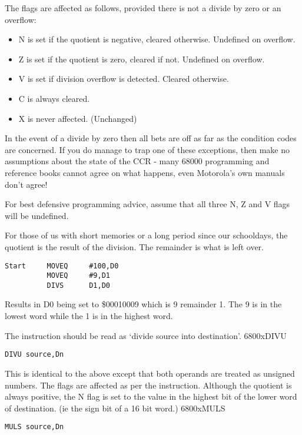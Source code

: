 The flags are affected as follows, provided there is not a divide by zero or an overflow:
\begin{itemize}[itemsep=0pt]

\item{}N is set if the quotient is negative, cleared otherwise.
          Undefined on overflow.


\item{}Z is set if the quotient is zero, cleared if not. Undefined on
          overflow.


\item{}V is set if division overflow is detected. Cleared
          otherwise.


\item{}C is always cleared.


\item{}X is never affected. (Unchanged)

\end{itemize}

\begin{warning}
In the event of a divide by zero then all bets are off as far as the condition codes are concerned. If you do manage to trap one of these exceptions, then make no assumptions about the state of the CCR - many 68000 programming and reference books cannot agree on what happens, even  Motorola's own manuals don't agree!

For best defensive programming advice, assume that all three N, Z and V flags will be undefined.
\end{warning}

For those of us with short memories or a long period since our
      schooldays, the quotient is the result of the division. The remainder is
      what is left over.

\begin{lstlisting}[firstnumber=1,caption={DIVS Example}]
Start     MOVEQ     #100,D0
          MOVEQ     #9,D1
          DIVS      D1,D0
\end{lstlisting}

Results in D0 being set to \$00010009 which is 9 remainder 1. The 9
      is in the lowest word while the 1 is in the highest word.

The instruction should be read as `divide source into
      destination'.
\mc6800x{DIVU}
\begin{lstlisting}[firstnumber=1]
          DIVU source,Dn
\end{lstlisting}

This is identical to the above except that both operands are
      treated as unsigned numbers. The flags are affected as per the 
      instruction. Although the quotient is always positive, the N flag is set
      to the value in the highest bit of the lower word of destination. (ie
      the sign bit of a 16 bit word.)
\mc6800x{MULS}
\begin{lstlisting}[firstnumber=1,]
          MULS source,Dn
\end{lstlisting}


